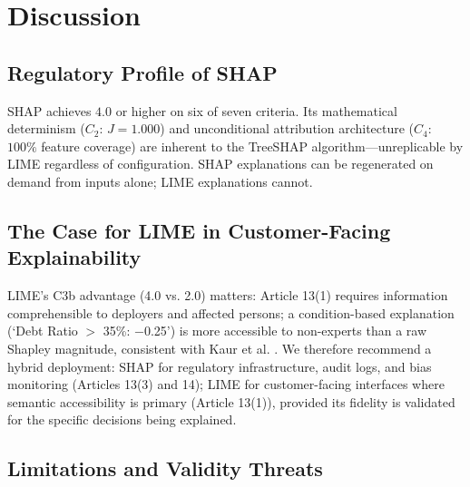 \documentclass[conference]{IEEEtran}
\begin{document}
\section{Discussion}

\subsection{Regulatory Profile of SHAP}

SHAP achieves $4.0$ or higher on six of seven criteria. Its mathematical determinism ($C_2$: $J = 1.000$) and unconditional attribution architecture ($C_4$: $100\%$ feature coverage) are inherent to the TreeSHAP algorithm---unreplicable by LIME regardless of configuration. SHAP explanations can be regenerated on demand from inputs alone; LIME explanations cannot.
\subsection{The Case for LIME in Customer-Facing Explainability}

LIME's C3b advantage (4.0 vs. 2.0) matters: Article 13(1) requires information comprehensible to deployers and affected persons; a condition-based explanation (`Debt Ratio $>$ 35\%: $-$0.25') is more accessible to non-experts than a raw Shapley magnitude, consistent with Kaur et al. \cite{b6}. We therefore recommend a hybrid deployment: SHAP for regulatory infrastructure, audit logs, and bias monitoring (Articles 13(3) and 14); LIME for customer-facing interfaces where semantic accessibility is primary (Article 13(1)), provided its fidelity is validated for the specific decisions being explained.


\subsection{Limitations and Validity Threats}
\end{document}
